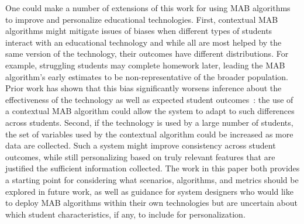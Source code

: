 One could make a number of extensions of this work for using MAB algorithms to improve and personalize educational technologies. First, contextual MAB algorithms might mitigate issues of biases when different types of students interact with an educational technology and while all are most helped by the same version of the technology, their outcomes have different distributions. For example, struggling students may complete homework later, leading the MAB algorithm's early estimates to be non-representative of the broader population. Prior work has shown that this bias significantly worsens inference about the effectiveness of the technology as well as expected student outcomes~\cite{rafferty2019statistical}: the use of a contextual MAB algorithm could allow the system to adapt to such differences across students. Second, if the technology is used by a large number of students, the set of variables used by the contextual algorithm could be increased as more data are collected. Such a system might improve consistency across student outcomes, while still personalizing based on truly relevant features that are justified the sufficient information collected. The work in this paper both provides a starting point for considering what scenarios, algorithms, and metrics should be explored in future work, as well as guidance for system designers who would like to deploy MAB algorithms within their own technologies but are uncertain about which student characteristics, if any, to include for personalization.


